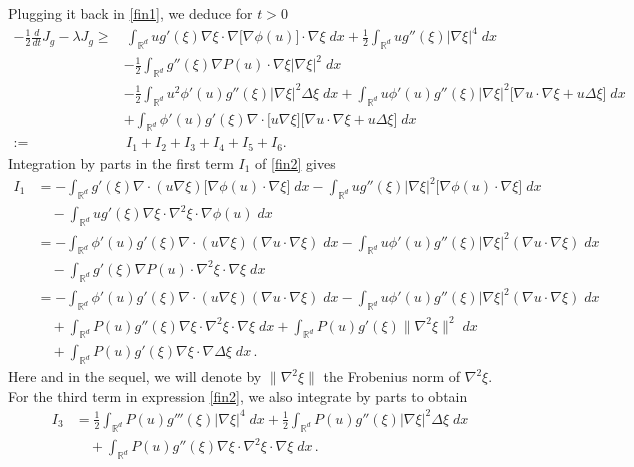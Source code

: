 \documentclass[reqno]{amsart}
\newcommand{\R}{\mathbb{R}}
\begin{document}
Plugging it back in \eqref{fin1}, we deduce for $t>0$
\begin{align}
  -\frac12\frac{d}{dt} J_g - \lambda J_g
  \geq&\,  \int_{\R^d} ug'(\xi)\nabla\xi\cdot\nabla\big[\nabla \phi(u)\big]\cdot\nabla\xi\;dx
  + \frac12 \int_{\R^d} ug''(\xi)|\nabla\xi|^4 \;dx\nonumber\\&-\frac12\int_{\R^d} g''(\xi)\nabla P(u)\cdot\nabla\xi|\nabla\xi|^2\;dx \nonumber\\
  & - \frac12\int_{\R^d} u^2\phi'(u)g''(\xi)|\nabla\xi|^2\Delta\xi\;dx + \int_{\R^d} u\phi'(u)g''(\xi)|\nabla\xi|^2\big[\nabla u\cdot\nabla\xi + u\Delta\xi\big] \;dx\nonumber\\
  & + \int_{\R^d} \phi'(u)g'(\xi)\nabla\cdot\big[u\nabla\xi\big]\big[\nabla u\cdot\nabla\xi + u\Delta\xi\big]\;dx\nonumber\\
  := &\,I_1+I_2+I_3+I_4+I_5+I_6.
 \label{fin2}
\end{align}
Integration by parts in the first term $I_1$ of \eqref{fin2} gives
\begin{align}\label{V-3rd}
  I_1&= - \int_{\R^d} g'(\xi) \nabla\cdot(u\nabla\xi) \big[\nabla \phi(u)\cdot\nabla\xi \big] \;dx
  - \int_{\R^d} ug''(\xi) |\nabla\xi|^2 \big[\nabla \phi(u)\cdot\nabla\xi \big] \;dx\ \nonumber \\
  &\quad - \int_{\R^d} ug'(\xi)\nabla\xi\cdot\nabla^2\xi\cdot\nabla \phi(u) \;dx\nonumber \\
  &= -\int_{\R^d} \phi'(u)g'(\xi) \nabla\cdot(u\nabla\xi)(\nabla u\cdot\nabla\xi)\;dx
  - \int_{\R^d} u\phi'(u)g''(\xi) |\nabla\xi|^2 (\nabla u\cdot\nabla\xi)\;dx\nonumber  \\
  &\quad - \int_{\R^d} g'(\xi) \nabla P(u)\cdot\nabla^2\xi\cdot\nabla\xi \;dx\nonumber \\
  &= -\int_{\R^d} \phi'(u)g'(\xi) \nabla\cdot(u\nabla\xi)(\nabla u\cdot\nabla\xi)\;dx
  - \int_{\R^d} u\phi'(u)g''(\xi) |\nabla\xi|^2 (\nabla u\cdot\nabla\xi)\;dx \nonumber \\
  &\quad 
  + \int_{\R^d} P(u)g''(\xi) \nabla\xi\cdot\nabla^2\xi\cdot\nabla\xi \;dx
  + \int_{\R^d} P(u)g'(\xi)\|\nabla^2\xi\|^2\;dx \nonumber \\
  &\quad+ \int_{\R^d} P(u)g'(\xi)\nabla\xi\cdot\nabla\Delta\xi\;dx\,.
\end{align}
Here and in the sequel, we will denote by $\|\nabla^2\xi\|$ the Frobenius norm of $\nabla^2\xi$.
For the third term in expression \eqref{fin2}, we also integrate by parts to obtain
\begin{align*}
  I_3&=\frac12\int_{\R^d} P(u)g'''(\xi)|\nabla\xi|^4 \;dx+ \frac12\int_{\R^d} P(u)g''(\xi)|\nabla\xi|^2\Delta\xi \;dx\nonumber\\
  &\quad+ \int_{\R^d} P(u)g''(\xi)\nabla\xi\cdot\nabla^2\xi\cdot\nabla\xi\;dx\,.
\end{align*}
\end{document}
